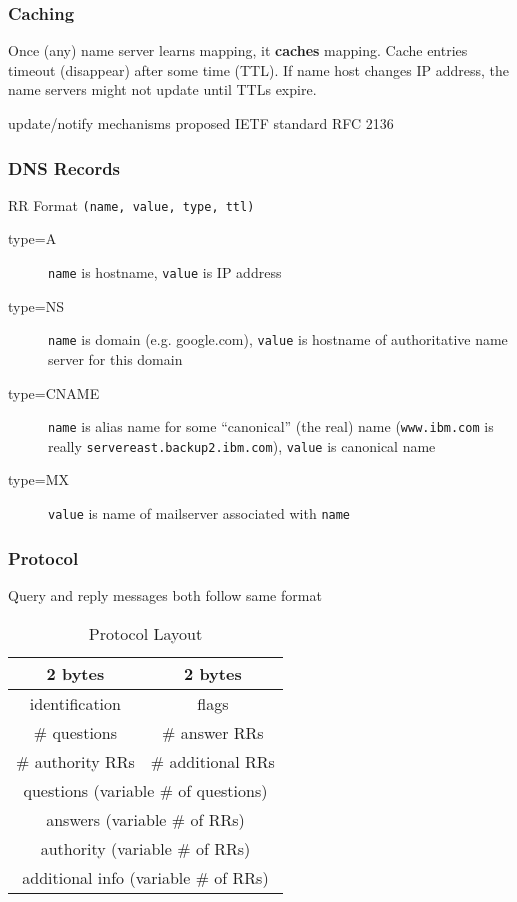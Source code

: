\subsubsection{Caching}
Once (any) name server learns mapping, it \textbf{caches} mapping. Cache entries timeout (disappear) after some time (TTL). If name host changes IP address, the name servers might not update until TTLs expire.
\begin{leftbar}
	update/notify mechanisms proposed IETF standard RFC 2136
\end{leftbar}
\subsubsection{DNS Records}
\begin{note}{RR Format}
	\texttt{(name, value, type, ttl)}
\end{note}
\begin{description}
	\item[type=A] \texttt{name} is hostname, \texttt{value} is IP address
	\item[type=NS] \texttt{name} is domain (e.g. google.com), \texttt{value} is hostname of authoritative name server for this domain
	\item[type=CNAME] \texttt{name} is alias name for some ``canonical'' (the real) name (\texttt{www.ibm.com} is really \texttt{servereast.backup2.ibm.com}), \texttt{value} is canonical name
	\item[type=MX] \texttt{value} is name of mailserver associated with \texttt{name}
\end{description}
\subsubsection{Protocol}
Query and reply messages both follow same format
\begin{table}[H]
\centering
\caption{Protocol Layout}
\begin{tabular}{cc}
	\toprule
	2 bytes & 2 bytes \\
	\midrule
	identification & flags\\
	\# questions & \# answer RRs\\
	\# authority RRs & \# additional RRs\\
	\multicolumn{2}{c}{questions (variable \# of questions)}\\
	\multicolumn{2}{c}{answers (variable \# of RRs)}\\
	\multicolumn{2}{c}{authority (variable \# of RRs)}\\
	\multicolumn{2}{c}{additional info (variable \# of RRs)}\\
	\bottomrule
\end{tabular}
\end{table}
